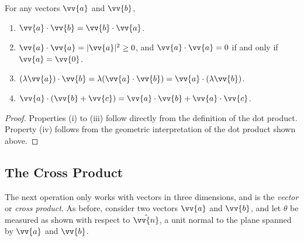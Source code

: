   \begin{proposition}
      For any vectors $\vv{a}$ and $\vv{b}$,
      \begin{enumerate}[label=(\roman*)]
          \item $\vv{a} \cdot \vv{b} = \vv{b} \cdot \vv{a}$.
          \item $\vv{a} \cdot \vv{a} = |\vv{a}|^2 \geq 0$, and $\vv{a} \cdot \vv{a} = 0$ if and only if $\vv{a} = \vv{0}$.
          \item $(\lambda \vv{a}) \cdot \vv{b} = \lambda (\vv{a} \cdot \vv{b}) = \vv{a} \cdot (\lambda \vv{b})$.
          \item $\vv{a} \cdot (\vv{b} + \vv{c}) = \vv{a} \cdot \vv{b} + \vv{a} \cdot \vv{c}$. 
      \end{enumerate}
  \end{proposition}
  \begin{proof}
      Properties (i) to (iii) follow directly from the definition of the dot product. Property (iv) follows from the geometric interpretation of the dot product shown above. 
  \end{proof}



\subsection{The Cross Product}

The next operation only works with vectors in three dimensions, and is the \emph{vector} or \emph{cross product}. As before, consider two vectors $\vv{a}$ and $\vv{b}$, and let $\theta$ be measured as shown with respect to $\hat{\vv{n}}$, a unit normal to the plane spanned by $\vv{a}$ and $\vv{b}$.

\begin{center}
  \end{center}

